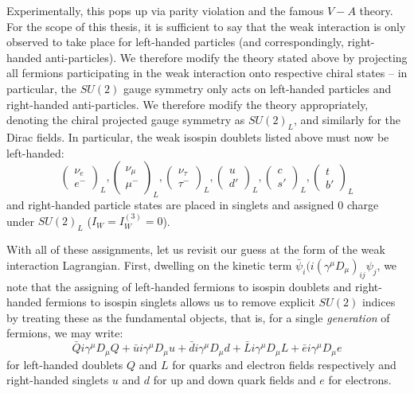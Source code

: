Experimentally, this pops up via parity violation and the famous $V - A$ theory. 
For the scope of this thesis, it is sufficient to say that the weak interaction is only observed to take
place for left-handed particles (and correspondingly, right-handed anti-particles). We therefore modify the 
theory stated above by projecting all fermions participating in the weak interaction onto respective chiral
states -- in particular, the $SU(2)$ gauge symmetry only acts on left-handed particles and right-handed anti-particles.
We therefore modify the theory appropriately, denoting the chiral projected gauge symmetry as $SU(2)_{L}$, 
and similarly for the Dirac fields. In particular, the weak isospin doublets listed above must now be 
left-handed:
\begin{equation}
\begin{pmatrix}\nu_{e} \\ e^{-}\end{pmatrix}_L, \begin{pmatrix}\nu_{\mu} \\ \mu^{-}\end{pmatrix}_L, 
\begin{pmatrix}\nu_{\tau} \\ \tau^{-}\end{pmatrix}_L, \begin{pmatrix}u \\ d'\end{pmatrix}_L, 
\begin{pmatrix}c \\ s'\end{pmatrix}_L, \begin{pmatrix}t \\ b'\end{pmatrix}_L
\end{equation}
and right-handed particle states are placed in singlets and assigned $0$ charge under $SU(2)_{L}$ ($I_{W} = I_{W}^{(3)}=0$).

With all of these assignments, let us revisit our guess at the form of the weak interaction Lagrangian.
First, dwelling on the kinetic term $\bar{\psi}_{i}(i(\gamma^{\mu}D_{\mu})_{ij}\psi_{j}$, we note that 
the assigning of left-handed fermions to isospin doublets and right-handed fermions to 
isospin singlets allows us to remove explicit $SU(2)$ indices by treating these as the fundamental objects,
that is, for a single \emph{generation} of fermions, we may write:
\begin{equation}
\bar{Q}i\gamma^{\mu}D_{\mu}Q + \bar{u}i\gamma^{\mu}D_{\mu}u +\bar{d}i\gamma^{\mu}D_{\mu}d +\bar{L}i\gamma^{\mu}D_{\mu}L +\bar{e}i\gamma^{\mu}D_{\mu}e
\end{equation}
for left-handed doublets $Q$ and $L$ for quarks and electron fields respectively and right-handed singlets 
$u$ and $d$ for up and down quark fields and $e$ for electrons.

